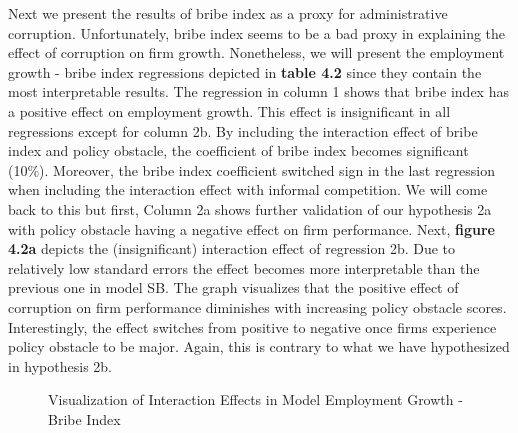 Next we present the results of bribe index as a proxy for administrative corruption. Unfortunately, bribe index seems to be a bad proxy in explaining the effect of corruption on firm growth. Nonetheless, we will present the employment growth - bribe index regressions depicted in \textbf{table 4.2} since they contain the most interpretable results. The regression in column 1 shows that bribe index has a positive effect on employment growth. This effect is insignificant in all regressions except for column 2b. By including the interaction effect of bribe index and policy obstacle, the coefficient of bribe index becomes significant (10\%). Moreover, the bribe index coefficient switched sign in the 
last regression when including the interaction effect with informal competition. We will come back to this but first,
Column 2a shows further validation of our hypothesis 2a with policy obstacle having a negative effect on firm performance. Next, \textbf{figure 4.2a} depicts the (insignificant) interaction effect of regression 2b. Due to relatively low standard errors the effect becomes more interpretable than the previous one in model SB. The graph visualizes that the positive effect of corruption on firm performance diminishes with increasing policy obstacle scores. Interestingly, the effect switches from positive to negative once firms experience policy obstacle to be major. Again, this is contrary to what we have hypothesized in hypothesis 2b.

\begin{figure}[h]%
    \centering
    \begin{subfigure}
    \texttt{[image: chinchilab-template/Pictures/IE\_ModelEBI\_a.png]}
    \end{subfigure}
    \begin{subfigure}
    \texttt{[image: chinchilab-template/Pictures/IE\_ModelEBI\_b.png]}
    \end{subfigure}
    \caption{Visualization of Interaction Effects in Model Employment Growth - Bribe Index}%
\end{figure}

